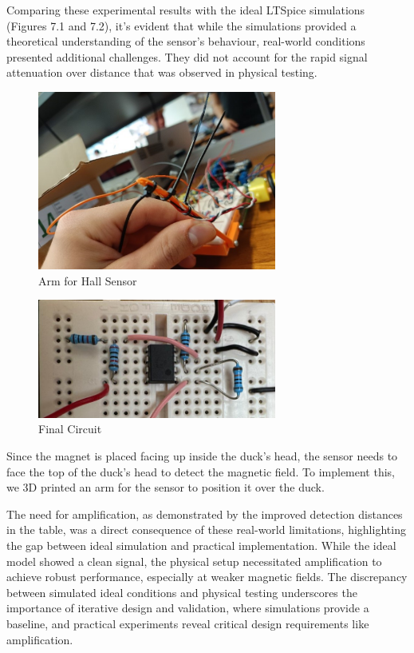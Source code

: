 Comparing these experimental results with the ideal LTSpice simulations (Figures 7.1 and 7.2), it's evident that while the simulations provided a theoretical understanding of the sensor's behaviour, real-world conditions presented additional challenges. They did not account for the rapid signal attenuation over distance that was observed in physical testing.
\begin{figure}[H]
    \centering
    \includegraphics[width=0.7\textwidth]{subpages/images/magnet_arm_irl.png}
    \caption{Arm for Hall Sensor}
    \label{fig:magnet_arm}
\end{figure}
\begin{figure}[H]
    \centering
    \includegraphics[width=0.7\textwidth]{subpages/images/magnet_circuit_irl.png}
    \caption{Final Circuit}
    \label{fig:circuit_irl}
\end{figure}
Since the magnet is placed facing up inside the duck’s head, the sensor needs to face the top of the duck’s head to detect the magnetic field. To implement this, we 3D printed an arm for the sensor to position it over the duck.

The need for amplification, as demonstrated by the improved detection distances in the table, was a direct consequence of these real-world limitations, highlighting the gap between ideal simulation and practical implementation. While the ideal model showed a clean signal, the physical setup necessitated amplification to achieve robust performance, especially at weaker magnetic fields. The discrepancy between simulated ideal conditions and physical testing underscores the importance of iterative design and validation, where simulations provide a baseline, and practical experiments reveal critical design requirements like amplification.